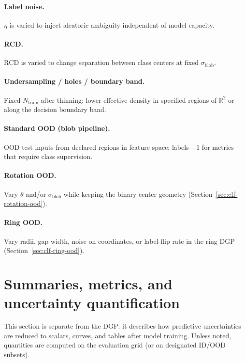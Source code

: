 \paragraph{Label noise.}
$\eta$ is varied to inject aleatoric ambiguity independent of model capacity.

\paragraph{RCD.}
$\mathrm{RCD}$ is varied to change separation between class centers at fixed $\sigma_{\mathrm{blob}}$.

\paragraph{Undersampling / holes / boundary band.}
Fixed $N_{\mathrm{train}}$ after thinning: lower effective density in specified regions of $\mathbb{R}^2$ or along the decision boundary band.

\paragraph{Standard OOD (blob pipeline).}
OOD test inputs from declared regions in feature space; labels $-1$ for metrics that require class supervision.

\paragraph{Rotation OOD.}
Vary $\theta$ and/or $\sigma_{\mathrm{blob}}$ while keeping the binary center geometry (Section~\ref{sec:clf-rotation-ood}).

\paragraph{Ring OOD.}
Vary radii, gap width, noise on coordinates, or label-flip rate in the ring DGP (Section~\ref{sec:clf-ring-ood}).

\section{Summaries, metrics, and uncertainty quantification}
\label{sec:summaries-metrics}

This section is separate from the DGP: it describes how predictive uncertainties are reduced to scalars, curves, and tables after model training. Unless noted, quantities are computed on the evaluation grid (or on designated ID/OOD subsets).

